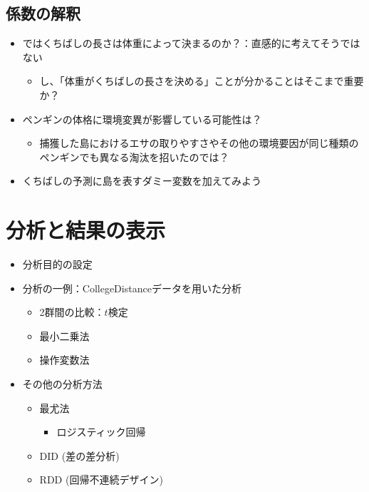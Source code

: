 \documentclass[
]{ltjsarticle}
\providecommand{\tightlist}{%
  \setlength{\itemsep}{0pt}\setlength{\parskip}{0pt}}
\begin{document}
\hypertarget{ux4fc2ux6570ux306eux89e3ux91c8}{%
\subsection{係数の解釈}\label{ux4fc2ux6570ux306eux89e3ux91c8}}

\begin{itemize}
\tightlist
\item
  ではくちばしの長さは体重によって決まるのか？：直感的に考えてそうではない

  \begin{itemize}
  \tightlist
  \item
    し、「体重がくちばしの長さを決める」ことが分かることはそこまで重要か？
  \end{itemize}
\item
  ペンギンの体格に環境変異が影響している可能性は？

  \begin{itemize}
  \tightlist
  \item
    捕獲した島におけるエサの取りやすさやその他の環境要因が同じ種類のペンギンでも異なる淘汰を招いたのでは？
  \end{itemize}
\item
  くちばしの予測に島を表すダミー変数を加えてみよう
\end{itemize}

\hypertarget{ux5206ux6790ux3068ux7d50ux679cux306eux8868ux793a}{%
\section{分析と結果の表示}\label{ux5206ux6790ux3068ux7d50ux679cux306eux8868ux793a}}

\begin{itemize}
\tightlist
\item
  分析目的の設定
\item
  分析の一例：CollegeDistanceデータを用いた分析

  \begin{itemize}
  \tightlist
  \item
    2群間の比較：\(t\)検定
  \item
    最小二乗法
  \item
    操作変数法
  \end{itemize}
\item
  その他の分析方法

  \begin{itemize}
  \tightlist
  \item
    最尤法

    \begin{itemize}
    \tightlist
    \item
      ロジスティック回帰
    \end{itemize}
  \item
    DID (差の差分析)
  \item
    RDD (回帰不連続デザイン)
  \end{itemize}
\end{itemize}
\end{document}
